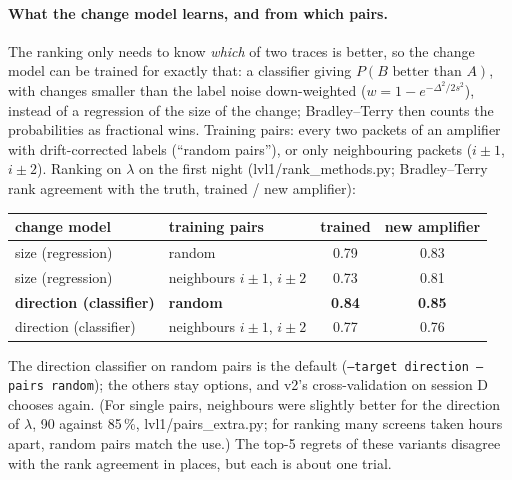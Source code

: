 \documentclass[11pt]{article}
\begin{document}
\paragraph{What the change model learns, and from which pairs.} The ranking only needs to know \emph{which} of two traces
is better, so the change model can be trained for exactly that: a classifier giving $P(B\text{ better than }A)$, with
changes smaller than the label noise down-weighted ($w=1-e^{-\Delta^2/2s^2}$), instead of a regression of the size of the
change; Bradley--Terry then counts the probabilities as fractional wins. Training pairs: every two packets of an
amplifier with drift-corrected labels (``random pairs''), or only neighbouring packets ($i\pm1$, $i\pm2$). Ranking on
$\lambda$ on the first night (lvl1/rank\_methods.py; Bradley--Terry rank agreement with the truth, trained / new
amplifier):
\begin{center}\small
\begin{tabular}{llcc}\toprule
change model & training pairs & trained & new amplifier\\\midrule
size (regression) & random & 0.79 & 0.83\\
size (regression) & neighbours $i\pm1$, $i\pm2$ & 0.73 & 0.81\\
\textbf{direction (classifier)} & \textbf{random} & \textbf{0.84} & \textbf{0.85}\\
direction (classifier) & neighbours $i\pm1$, $i\pm2$ & 0.77 & 0.76\\\bottomrule
\end{tabular}
\end{center}
The direction classifier on random pairs is the default (\texttt{--target direction --pairs random}); the others stay
options, and v2's cross-validation on session D chooses again. (For single pairs, neighbours were slightly better for
the direction of $\lambda$, 90 against 85\,\%, lvl1/pairs\_extra.py; for ranking many screens taken hours apart, random
pairs match the use.) The top-5 regrets of these variants disagree with the rank agreement in places, but each is about
one trial.
\end{document}
